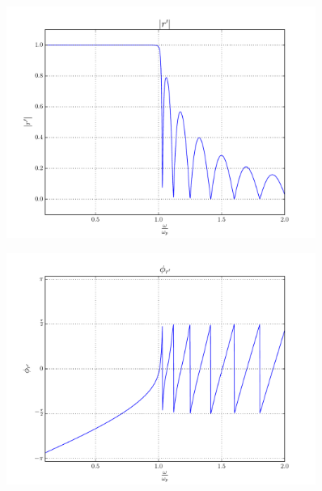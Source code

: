 \documentclass[a4paper,11pt]{article}
\begin{document}
                            \begin{figure}[!ht]
                            \centering \includegraphics[width=0.9\textwidth]{Punto1BC/rp_N.pdf}
                            \end{figure}
                            
                            \begin{figure}[!ht]
                            \centering \includegraphics[width=0.9\textwidth]{Punto1BC/rp_f.pdf}
                            \end{figure}
\end{document}
